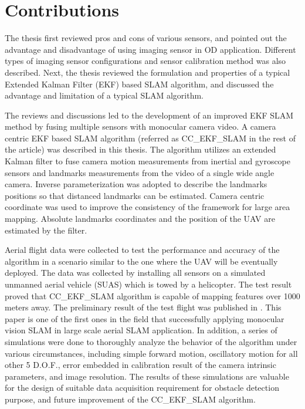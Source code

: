 \section{Contributions}\label{section:Contribution}
The thesis first reviewed pros and cons of various sensors, and pointed out the advantage and disadvantage of using
imaging sensor in OD application. Different types of imaging sensor
configurations and sensor calibration method was also described. Next, the
thesis reviewed the formulation and properties of a typical Extended
Kalman Filter (EKF) based SLAM algorithm, and discussed the advantage
and limitation of a typical SLAM algorithm. 

The reviews and discussions led to the development of an improved EKF SLAM
method by fusing multiple sensors with monocular camera video. 
A camera centric EKF based
SLAM algorithm (referred as CC\_EKF\_SLAM in the rest of the article)
was described in this thesis. The algorithm utilizes an extended Kalman
filter to fuse camera motion measurements from inertial and gyroscope
sensors and landmarks measurements from the video of a single wide angle
camera. Inverse parameterization was adopted to describe the landmarks
positions so that distanced landmarks can be estimated. Camera centric coordinate was used to improve the
consistency of the framework for large area mapping. Absolute landmarks coordinates and the position of the UAV are estimated by the filter.

Aerial flight data were collected to test the performance and accuracy
of the algorithm in a scenario similar to the one where the UAV will
be eventually deployed. The data was collected by installing all
sensors on a simulated unmanned aerial vehicle (SUAS) which is towed
by a helicopter. The test result proved that CC\_EKF\_SLAM algorithm
is capable of mapping features over 1000 meters away. The preliminary
result of the test flight was published in \cite{zhang_obstacle_2012}.
This paper is one of the first ones in the field that successfully
applying monocular vision SLAM in large scale aerial SLAM application.
In addition, a series of simulations were done to thoroughly analyze
the behavior of the algorithm under various circumstances, including
simple forward motion, oscillatory motion for all other 5 D.O.F.,
error embedded in calibration result of the camera intrinsic
parameters, and image resolution. The results of these simulations are
valuable for the design of suitable data acquisition requirement for
obstacle detection purpose, and future improvement of the
CC\_EKF\_SLAM algorithm.


